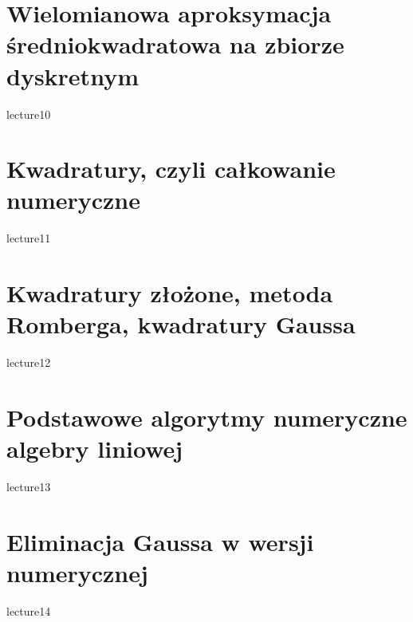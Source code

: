 \documentclass[12pt]{report}
\begin{document}
\chapter{Wielomianowa aproksymacja średniokwadratowa na zbiorze dyskretnym}
{lecture10}

\chapter{Kwadratury, czyli całkowanie numeryczne}
{lecture11}

\chapter{Kwadratury złożone, metoda Romberga, kwadratury Gaussa}
{lecture12}

\chapter{Podstawowe algorytmy numeryczne algebry liniowej}
{lecture13}

\chapter{Eliminacja Gaussa w wersji numerycznej}
{lecture14}



\end{document}

